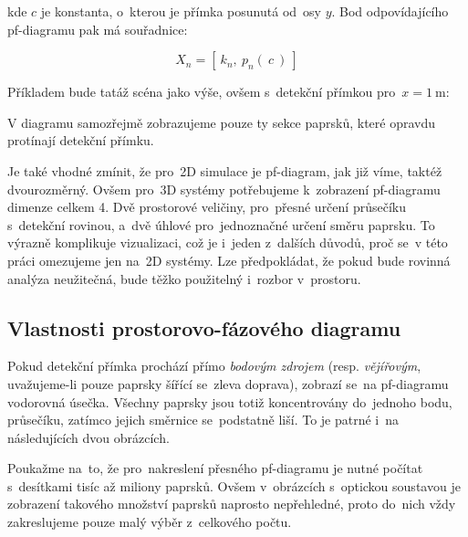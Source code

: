 kde $c$ je konstanta, o~kterou je přímka posunutá od~osy $y$. Bod odpovídajícího pf-dia\-gra\-mu pak má souřadnice:

\[ X_n = [\ k_n,\ p_n(\ c\ )\ ] \]

\beautypage

Příkladem bude tatáž scéna jako výše, ovšem s~detekční přímkou pro~$x = 1\ \mathrm{m}$:


V diagramu samozřejmě zobrazujeme pouze ty sekce paprsků, které opravdu protínají detekční přímku.

Je také vhodné zmínit, že pro~2D simulace je pf-diagram, jak již víme, taktéž dvourozměrný. Ovšem pro~3D systémy potřebujeme k~zobrazení pf-diagramu dimenze celkem 4. Dvě prostorové veličiny, pro~přesné určení průsečíku s~detekční rovinou, a~dvě úhlové pro~jednoznačné určení směru paprsku. To výrazně komplikuje vizualizaci, což je i~jeden z~dalších důvodů, proč se~v této práci omezujeme jen na~2D systémy. Lze předpokládat, že pokud bude rovinná analýza neužitečná, bude těžko použitelný i~rozbor v~prostoru.


\subsection{Vlastnosti prostorovo-fázového diagramu}
\label{sub:analyzasystemu_vlastnostipfdiagramu}

Pokud detekční přímka prochází přímo \emph{bodovým zdrojem} (resp. \emph{vějířovým}, uvažujeme-li pouze paprsky šířící se~zleva doprava), zobrazí se~na pf-diagramu vodorovná úsečka. Všechny paprsky jsou totiž koncentrovány do~jednoho bodu, průsečíku, zatímco jejich směrnice se~podstatně liší. To je patrné i~na následujících dvou obrázcích.

Poukažme na~to, že pro~nakreslení přesného pf-diagramu je nutné počítat s~desítkami tisíc až miliony paprsků. Ovšem v~obrázcích s~optickou soustavou je zobrazení takového množství paprsků naprosto nepřehledné, proto do~nich vždy zakreslujeme pouze malý výběr z~celkového počtu.


